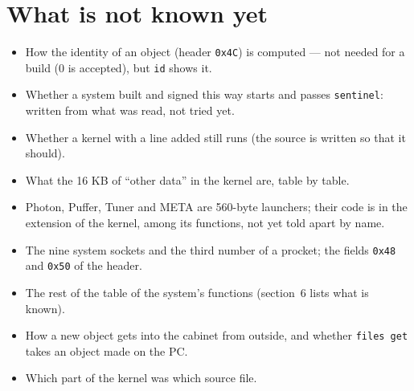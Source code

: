 \documentclass[11pt,a4paper]{article}
\newcommand{\cmd}[1]{\texttt{#1}}
\begin{document}
\section{What is not known yet}\label{sec:open}

\begin{itemize}
\item How the identity of an object (header \texttt{0x4C}) is computed --- not needed for a
      build (0 is accepted), but \cmd{id} shows it.
\item Whether a system built and signed this way starts and passes \cmd{sentinel}: written from
      what was read, not tried yet.
\item Whether a kernel with a line added still runs (the source is written so that it should).
\item What the 16 KB of ``other data'' in the kernel are, table by table.
\item Photon, Puffer, Tuner and META are 560-byte launchers; their code is in the extension of
      the kernel, among its functions, not yet told apart by name.
\item The nine system sockets and the third number of a procket; the fields \texttt{0x48} and
      \texttt{0x50} of the header.
\item The rest of the table of the system's functions (section~6 lists what is known).
\item How a new object gets into the cabinet from outside, and whether \cmd{files get} takes an
      object made on the PC.
\item Which part of the kernel was which source file.
\end{itemize}
\end{document}
